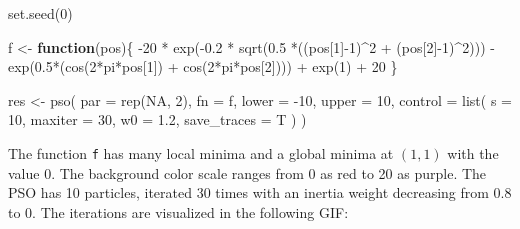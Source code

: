 \documentclass[
  oneside]{book}
\newenvironment{Shaded}{\begin{snugshade}}{\end{snugshade}}
\newcommand{\AttributeTok}[1]{\textcolor[rgb]{0.77,0.63,0.00}{#1}}
\newcommand{\ConstantTok}[1]{\textcolor[rgb]{0.00,0.00,0.00}{#1}}
\newcommand{\ControlFlowTok}[1]{\textcolor[rgb]{0.13,0.29,0.53}{\textbf{#1}}}
\newcommand{\DecValTok}[1]{\textcolor[rgb]{0.00,0.00,0.81}{#1}}
\newcommand{\FloatTok}[1]{\textcolor[rgb]{0.00,0.00,0.81}{#1}}
\newcommand{\FunctionTok}[1]{\textcolor[rgb]{0.00,0.00,0.00}{#1}}
\newcommand{\NormalTok}[1]{#1}
\newcommand{\OtherTok}[1]{\textcolor[rgb]{0.56,0.35,0.01}{#1}}
\newcommand{\SpecialCharTok}[1]{\textcolor[rgb]{0.00,0.00,0.00}{#1}}
\begin{document}
\begin{Shaded}
\begin{Highlighting}[]
\FunctionTok{set.seed}\NormalTok{(}\DecValTok{0}\NormalTok{)}

\NormalTok{f }\OtherTok{\textless{}{-}} \ControlFlowTok{function}\NormalTok{(pos)\{}
  \SpecialCharTok{{-}}\DecValTok{20} \SpecialCharTok{*} \FunctionTok{exp}\NormalTok{(}\SpecialCharTok{{-}}\FloatTok{0.2} \SpecialCharTok{*} \FunctionTok{sqrt}\NormalTok{(}\FloatTok{0.5} \SpecialCharTok{*}\NormalTok{((pos[}\DecValTok{1}\NormalTok{]}\SpecialCharTok{{-}}\DecValTok{1}\NormalTok{)}\SpecialCharTok{\^{}}\DecValTok{2} \SpecialCharTok{+}\NormalTok{ (pos[}\DecValTok{2}\NormalTok{]}\SpecialCharTok{{-}}\DecValTok{1}\NormalTok{)}\SpecialCharTok{\^{}}\DecValTok{2}\NormalTok{))) }\SpecialCharTok{{-}} 
  \FunctionTok{exp}\NormalTok{(}\FloatTok{0.5}\SpecialCharTok{*}\NormalTok{(}\FunctionTok{cos}\NormalTok{(}\DecValTok{2}\SpecialCharTok{*}\NormalTok{pi}\SpecialCharTok{*}\NormalTok{pos[}\DecValTok{1}\NormalTok{]) }\SpecialCharTok{+} \FunctionTok{cos}\NormalTok{(}\DecValTok{2}\SpecialCharTok{*}\NormalTok{pi}\SpecialCharTok{*}\NormalTok{pos[}\DecValTok{2}\NormalTok{]))) }\SpecialCharTok{+} 
  \FunctionTok{exp}\NormalTok{(}\DecValTok{1}\NormalTok{) }\SpecialCharTok{+} \DecValTok{20}
\NormalTok{\}}

\NormalTok{res }\OtherTok{\textless{}{-}} \FunctionTok{pso}\NormalTok{(}
  \AttributeTok{par =} \FunctionTok{rep}\NormalTok{(}\ConstantTok{NA}\NormalTok{, }\DecValTok{2}\NormalTok{),}
  \AttributeTok{fn =}\NormalTok{ f,}
  \AttributeTok{lower =} \SpecialCharTok{{-}}\DecValTok{10}\NormalTok{,}
  \AttributeTok{upper =} \DecValTok{10}\NormalTok{,}
  \AttributeTok{control =} \FunctionTok{list}\NormalTok{(}
    \AttributeTok{s =} \DecValTok{10}\NormalTok{,}
    \AttributeTok{maxiter =} \DecValTok{30}\NormalTok{,}
    \AttributeTok{w0 =} \FloatTok{1.2}\NormalTok{,}
    \AttributeTok{save\_traces =}\NormalTok{ T}
\NormalTok{  )}
\NormalTok{)}
\end{Highlighting}
\end{Shaded}

The function \texttt{f} has many local minima and a global minima at \((1,1)\) with the value \(0\). The background color scale ranges from 0 as red to 20 as purple. The PSO has 10 particles, iterated 30 times with an inertia weight decreasing from 0.8 to 0. The iterations are visualized in the following GIF:

\begin{center}
\end{center}
\end{document}
